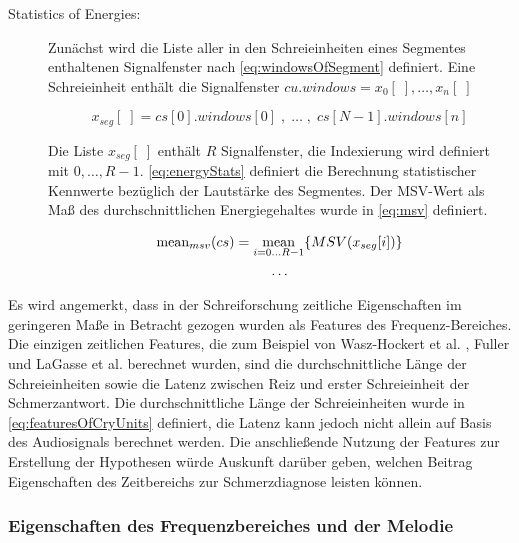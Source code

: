 \begin{description}
\item[Statistics of Energies:] Zunächst wird die Liste aller in den Schreieinheiten eines Segmentes enthaltenen Signalfenster nach \autoref{eq:windowsOfSegment} definiert. Eine Schreieinheit enthält die Signalfenster $cu.windows = x_0[\;],\ldots,x_n[\;]$

\begin{equation}
x_{seg}[\; ] = cs[0].windows[0] \;  , \; \ldots \; , \; cs[N-1].windows[n] 
\label{eq:windowsOfSegment}
\end{equation}

Die Liste $x_{seg}[\; ]$ enthält $R$ Signalfenster, die Indexierung wird definiert mit $0, \ldots, R-1$.  \autoref{eq:energyStats} definiert die Berechnung statistischer Kennwerte bezüglich der \glqq Lautstärke des Segmentes\grqq. Der MSV-Wert als Maß des durchschnittlichen Energiegehaltes wurde in \autoref{eq:msv} definiert.

\begin{equation}
\begin{gathered}
\text{mean}_{msv}(cs) = \operatorname*{mean}_{i = 0 \ldots R-1}\{MSV(x_{seg}[i])\} \\
\ldots
\end{gathered}
\label{eq:energyStats}
\end{equation}

\end{description}

Es wird angemerkt, dass in der Schreiforschung zeitliche Eigenschaften im geringeren Maße in Betracht gezogen wurden als Features des Frequenz-Bereiches. Die einzigen zeitlichen Features, die zum Beispiel von Wasz-Hockert et al. \cite{25years}, Fuller \cite{threeCryTypes} und LaGasse et al. \cite{parentalPerception} berechnet wurden, sind \glqq die durchschnittliche Länge der Schreieinheiten\grqq{} sowie die \glqq Latenz zwischen Reiz und erster Schreieinheit der Schmerzantwort\grqq. Die durchschnittliche Länge der Schreieinheiten wurde in \autoref{eq:featuresOfCryUnits} definiert, die Latenz kann jedoch nicht allein auf Basis des Audiosignals berechnet werden. Die anschließende Nutzung der Features zur Erstellung der Hypothesen würde Auskunft darüber geben, welchen Beitrag Eigenschaften des Zeitbereichs zur Schmerzdiagnose leisten können.

\subsubsection{Eigenschaften des Frequenzbereiches und der Melodie}

